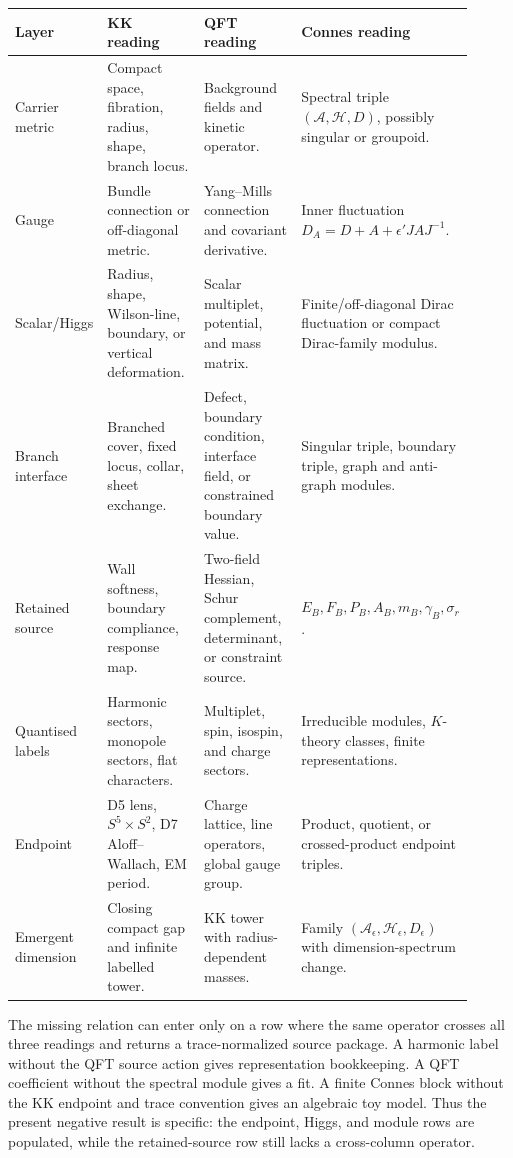 \documentclass[11pt]{article}
\newcommand{\DA}{D_A}
\begin{document}
\begin{center}
\small
\begin{tabular}{@{}L{0.14\linewidth}L{0.25\linewidth}L{0.25\linewidth}L{0.27\linewidth}@{}}
\toprule
Layer & KK reading & QFT reading & Connes reading \\
\midrule
Carrier metric
  & Compact space, fibration, radius, shape, branch locus.
  & Background fields and kinetic operator.
  & Spectral triple \((\mathcal A,\mathcal H,D)\), possibly singular or groupoid. \\
Gauge
  & Bundle connection or off-diagonal metric.
  & Yang--Mills connection and covariant derivative.
  & Inner fluctuation \(\DA=D+A+\epsilon'JAJ^{-1}\). \\
Scalar/Higgs
  & Radius, shape, Wilson-line, boundary, or vertical deformation.
  & Scalar multiplet, potential, and mass matrix.
  & Finite/off-diagonal Dirac fluctuation or compact Dirac-family modulus. \\
Branch interface
  & Branched cover, fixed locus, collar, sheet exchange.
  & Defect, boundary condition, interface field, or constrained boundary value.
  & Singular triple, boundary triple, graph and anti-graph modules. \\
Retained source
  & Wall softness, boundary compliance, response map.
  & Two-field Hessian, Schur complement, determinant, or constraint source.
  & \(E_B,F_B,P_B,A_B,m_B,\gamma_B,\sigma_r\). \\
Quantised labels
  & Harmonic sectors, monopole sectors, flat characters.
  & Multiplet, spin, isospin, and charge sectors.
  & Irreducible modules, \(K\)-theory classes, finite representations. \\
Endpoint
  & D5 lens, \(S^5\times S^2\), D7 Aloff--Wallach, EM period.
  & Charge lattice, line operators, global gauge group.
  & Product, quotient, or crossed-product endpoint triples. \\
Emergent dimension
  & Closing compact gap and infinite labelled tower.
  & KK tower with radius-dependent masses.
  & Family \((\mathcal A_\epsilon,\mathcal H_\epsilon,D_\epsilon)\) with dimension-spectrum change. \\
\bottomrule
\end{tabular}
\end{center}

The missing relation can enter only on a row where the same operator crosses
all three readings and returns a trace-normalized source package.  A harmonic
label without the QFT source action gives representation bookkeeping.  A QFT
coefficient without the spectral module gives a fit.  A finite Connes block
without the KK endpoint and trace convention gives an algebraic toy model.
Thus the present negative result is specific: the endpoint, Higgs, and module
rows are populated, while the retained-source row still lacks a
cross-column operator.
\end{document}
